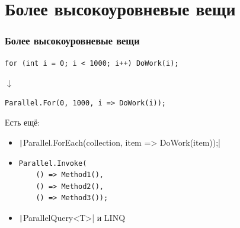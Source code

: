 \documentclass[xetex,mathserif,serif]{beamer}
\newcommand{\DownArrow} {
	\hspace{2cm}\begin{LARGE}$\downarrow$\end{LARGE}
}
\begin{document}
	\section{Более высокоуровневые вещи}

	\begin{frame}[fragile]
		\frametitle{Более высокоуровневые вещи}
		\begin{verbatim}
for (int i = 0; i < 1000; i++) DoWork(i);
		\end{verbatim}
		\DownArrow
		\begin{verbatim}
Parallel.For(0, 1000, i => DoWork(i));
		\end{verbatim}

		Есть ещё:
		\begin{itemize}
			\item \texttt|Parallel.ForEach(collection, item => DoWork(item));|
			\item 
				\begin{verbatim}
Parallel.Invoke(
    () => Method1(),
    () => Method2(),
    () => Method3());
				\end{verbatim}
			\item \texttt|ParallelQuery<T>| и LINQ
		\end{itemize}
	\end{frame}
\end{document}
